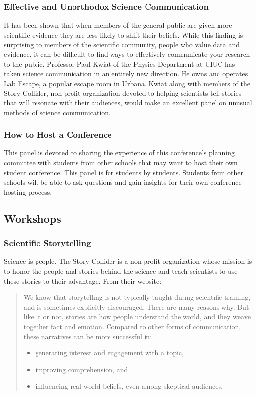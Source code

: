 \subsubsection{Effective and Unorthodox Science Communication}
It has been shown that when members of the general public are given more scientific evidence they are less likely to shift their beliefs. While this finding is surprising to members of the scientific community, people who value data and evidence, it can be difficult to find ways to effectively communicate your research to the public. Professor Paul Kwiat of the Physics Department at UIUC has taken science communication in an entirely new direction. He owns and operates Lab Escape, a popular escape room in Urbana. Kwiat along with members of the Story Collider, non-profit organization devoted to helping scientists tell stories that will resonate with their audiences, would make an excellent panel on unusual methods of science communication.

\subsubsection{How to Host a Conference}
This panel is devoted to sharing the experience of this conference's planning committee with students from other schools that may want to host their own student conference. This panel is for students by students. Students from other schools will be able to ask questions and gain insights for their own conference hosting process.


\subsection{Workshops}

\subsubsection{Scientific Storytelling}
Science is people. The Story Collider is a non-profit organization whose mission is to honor the people and stories behind the science and teach scientists to use these stories to their advantage. From their website:
\begin{quote}
	We know that storytelling is not typically taught during scientific training, and is sometimes explicitly discouraged. There are many reasons why. But like it or not, stories are how people understand the world, and they weave together fact and emotion. Compared to other forms of communication, these narratives can be more successful in:
	\begin{itemize}
		\item generating interest and engagement with a topic,
		\item improving comprehension, and
		\item influencing real-world beliefs, even among skeptical audiences.
	\end{itemize}
\end{quote}

